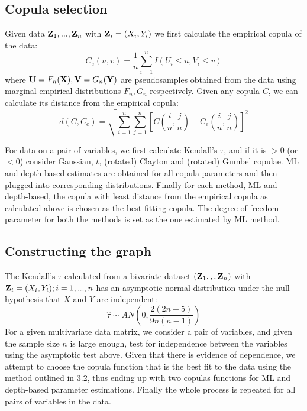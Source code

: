 \documentclass[11pt]{llncs}
\begin{document}
\subsection{Copula selection}Given data ${\mathbf{Z}}_1,...,{\mathbf{Z}}_n$ with ${\mathbf{Z}}_i=(X_i,Y_i)$ we first calculate the empirical copula of the data:
$$ C_e(u,v) = \frac{1}{n}\sum_{i=1}^n I(U_i\leq u, V_i\leq v)$$
where ${\mathbf{U}} = F_n({\mathbf{X}}), {\mathbf{V}} = G_n({\mathbf{Y}})$ are pseudosamples obtained from the data using marginal empirical distributions $F_n, G_n$ respectively. Given any copula $C$, we can calculate its distance from the empirical copula:
$$ d(C,C_e) = \sqrt{\sum_{i=1}^n\sum_{j=1}^n \left[C\left(\frac{i}{n},\frac{j}{n}\right) - C_e\left(\frac{i}{n},\frac{j}{n}\right)\right]^2} $$

For data on a pair of variables, we first calculate Kendall's $\tau$, and if it is $>0$ (or $<0$) consider Gaussian, $t$, (rotated) Clayton and (rotated) Gumbel copulae. ML and depth-based estimates are obtained for all copula parameters and then plugged into corresponding distributions. Finally for each method, ML and depth-based, the copula with least distance from the empirical copula as calculated above is chosen as the best-fitting copula. The degree of freedom parameter for both the methods is set as the one estimated by ML method.

\subsection{Constructing the graph}The Kendall's $\tau$ calculated from a bivariate dataset $({\mathbf{Z}}_1,,,{\mathbf{Z}}_n)$ with ${\mathbf{Z}}_i=(X_i,Y_i); i = 1,...,n$ has an asymptotic normal distribution under the null hypothesis that $X$ and $Y$ are independent:
$$ \hat\tau \sim AN\left(0,\frac{2(2n+5)}{9n(n-1)}\right) $$
For a given multivariate data matrix, we consider a pair of variables, and given the sample size $n$ is large enough, test for independence between the variables using the asymptotic test above. Given that there is evidence of dependence, we attempt to choose the copula function that is the best fit to the data using the method outlined in 3.2, thus ending up with two copulas functions for ML and depth-based parameter estimations. Finally the whole process is repeated for all pairs of variables in the data.
\end{document}
